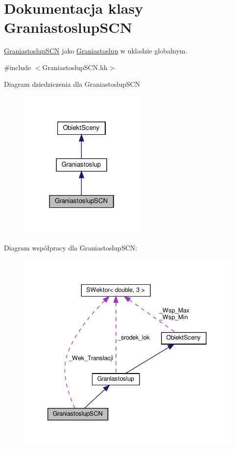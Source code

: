 \hypertarget{classGraniastoslupSCN}{}\section{Dokumentacja klasy Graniastoslup\+S\+CN}
\label{classGraniastoslupSCN}


\hyperlink{classGraniastoslupSCN}{Graniastoslup\+S\+CN} jako \hyperlink{classGraniastoslup}{Graniastoslup} w ukladzie globalnym.  




{\ttfamily \#include $<$Graniastoslup\+S\+C\+N.\+hh$>$}



Diagram dziedziczenia dla Graniastoslup\+S\+CN
\nopagebreak
\begin{figure}[H]
\begin{center}
\leavevmode
\includegraphics[width=178pt]{classGraniastoslupSCN__inherit__graph}
\end{center}
\end{figure}


Diagram współpracy dla Graniastoslup\+S\+CN\+:
\nopagebreak
\begin{figure}[H]
\begin{center}
\leavevmode
\includegraphics[width=339pt]{classGraniastoslupSCN__coll__graph}
\end{center}
\end{figure}
